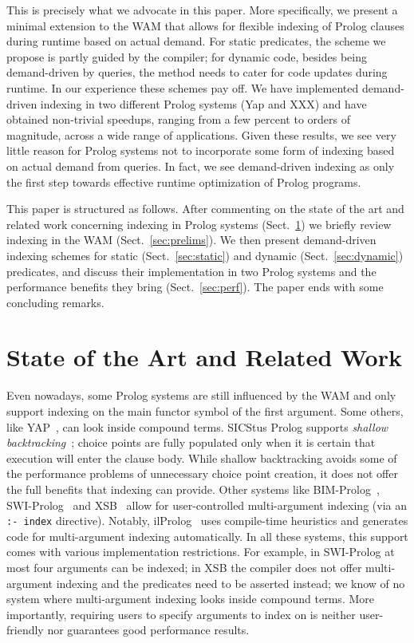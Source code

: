 \documentclass{llncs}
\newcommand{\code}[1]{\texttt{#1}}
\newcommand{\JITI}{demand-driven indexing\xspace}
\begin{document}
This is precisely what we advocate in this paper. More specifically,
we present a minimal extension to the WAM that allows for flexible
indexing of Prolog clauses during runtime based on actual demand. For
static predicates, the scheme we propose is partly guided by the
compiler; for dynamic code, besides being demand-driven by queries,
the method needs to cater for code updates during runtime. In our
experience these schemes pay off. We have implemented \JITI in two
different Prolog systems (Yap and XXX) and have obtained non-trivial
speedups, ranging from a few percent to orders of magnitude, across a
wide range of applications. Given these results, we see very little
reason for Prolog systems not to incorporate some form of indexing
based on actual demand from queries. In fact, we see \JITI as only the
first step towards effective runtime optimization of Prolog programs.

This paper is structured as follows. After commenting on the state of
the art and related work concerning indexing in Prolog systems
(Sect.~\ref{sec:related}) we briefly review indexing in the WAM
(Sect.~\ref{sec:prelims}). We then present \JITI schemes for static
(Sect.~\ref{sec:static}) and dynamic (Sect.~\ref{sec:dynamic})
predicates, and discuss their implementation in two Prolog systems and
the performance benefits they bring (Sect.~\ref{sec:perf}). The paper
ends with some concluding remarks.


\section{State of the Art and Related Work} \label{sec:related}
Even nowadays, some Prolog systems are still influenced by the WAM and
only support indexing on the main functor symbol of the first
argument. Some others, like YAP~\cite{YAP}, can look inside compound
terms. SICStus Prolog supports \emph{shallow
backtracking}~\cite{ShallowBacktracking@ICLP-89}; choice points are
fully populated only when it is certain that execution will enter the
clause body. While shallow backtracking avoids some of the performance
problems of unnecessary choice point creation, it does not offer the
full benefits that indexing can provide. Other systems like
BIM-Prolog~\cite{IndexingProlog@NACLP-89}, SWI-Prolog~\cite{SWI} and
XSB~\cite{XSB} allow for user-controlled multi-argument indexing (via
an \code{:-~index} directive). Notably, ilProlog~\cite{ilProlog} uses
compile-time heuristics and generates code for multi-argument indexing
automatically. In all these systems, this support comes with various
implementation restrictions. For example, in SWI-Prolog at most four
arguments can be indexed; in XSB the compiler does not offer
multi-argument indexing and the predicates need to be asserted
instead; we know of no system where multi-argument indexing looks
inside compound terms. More importantly, requiring users to specify
arguments to index on is neither user-friendly nor guarantees good
performance results.
\end{document}

